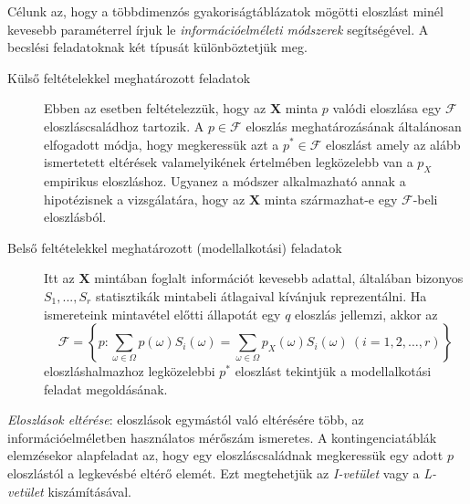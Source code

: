 \documentclass[%
	DIV=15,appendixprefix]{scrreprt}
\theoremstyle{definition}
\theoremstyle{remark}
\begin{document}
Célunk az, hogy a többdimenzós gyakoriságtáblázatok
mögötti eloszlást minél kevesebb paraméterrel írjuk le \emph{információelméleti módszerek}
segítségével. A becslési feladatoknak két típusát különböztetjük meg.
\begin{description}
	\item[Külső feltételekkel meghatározott feladatok] Ebben az esetben feltételezzük, hogy az
	$\mathbf{X}$ minta $p$ valódi eloszlása egy $\mathcal{F}$ eloszláscsaládhoz tartozik. A $p\in
	\mathcal{F}$ eloszlás meghatározásának általánosan elfogadott módja, hogy megkeressük azt a
	$p^* \in \mathcal{F}$ eloszlást amely az alább ismertetett eltérések valamelyikének értelmében
	legközelebb van a $p_X$ empirikus eloszláshoz. Ugyanez a módszer alkalmazható annak a
	hipotézisnek a vizsgálatára, hogy az $\mathbf{X}$ minta származhat-e egy $\mathcal{F}$-beli
	eloszlásból.
	\item[Belső feltételekkel meghatározott (modellalkotási) feladatok] Itt az $\mathbf{X}$ mintában
	foglalt információt kevesebb adattal, általában bizonyos $S_1 , . . . , S_r$ statisztikák
	mintabeli átlagaival kívánjuk reprezentálni. Ha ismereteink mintavétel előtti állapotát egy $q$
	eloszlás jellemzi, akkor az
	\begin{equation*}
		\mathcal{F}=\left\{
		p \colon \sum_{\omega \in \Omega} p\left(\omega\right) S_i\left(\omega\right)=
		\sum_{\omega \in \Omega} p_X\left(\omega\right) S_i\left(\omega\right) \  \left( i=1,{} 2,{} \ldots,{} r \right)
		\right\}
	\end{equation*}
	eloszláshalmazhoz legközelebbi $p^*$ eloszlást tekintjük a modellalkotási feladat megoldásának.
\end{description}
\emph{Eloszlások eltérése}: eloszlások egymástól való eltérésére több, az információelméletben
használatos mérőszám ismeretes. A kontingenciatáblák elemzésekor alapfeladat az, hogy egy
eloszláscsaládnak megkeressük egy adott $p$ eloszlástól a legkevésbé eltérő elemét. Ezt megtehetjük
az \emph{I-vetület} vagy a \emph{L-vetület} kiszámításával.
%
\end{document}
